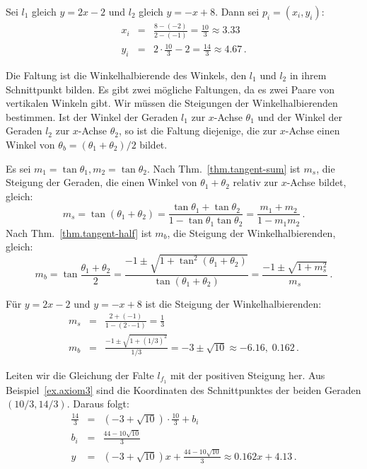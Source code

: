 \begin{example}\label{ex.axiom3}
Sei $l_1$ gleich $y=2x-2$ und $l_2$ gleich $y=-x+8$. Dann sei $p_i=(x_i,y_i)$:
\begin{eqnarray*}
x_i&=&\frac{8-(-2)}{2-(-1)}=\frac{10}{3}\approx 3.33\\
y_i &=& 2\cdot\frac{10}{3}-2=\frac{14}{3}\approx 4.67\,.
\end{eqnarray*}
\end{example}

Die Faltung ist die Winkelhalbierende des Winkels, den $l_1$ und $l_2$ in ihrem Schnittpunkt bilden. Es gibt zwei mögliche Faltungen, da es zwei Paare von vertikalen Winkeln gibt. Wir müssen die Steigungen der Winkelhalbierenden bestimmen. Ist der Winkel der Geraden $l_1$ zur $x$-Achse $\theta_1$ und der Winkel der Geraden $l_2$ zur $x$-Achse $\theta_2$, so ist die Faltung diejenige, die zur $x$-Achse einen Winkel von $\theta_b=(\theta_1+\theta_2)/2$ bildet.

Es sei $m_1=\tan\theta_1, m_2=\tan \theta_2$. Nach Thm.~\ref{thm.tangent-sum} ist $m_s$, die Steigung der Geraden, die einen Winkel von $\theta_1+\theta_2$ relativ zur $x$-Achse bildet, gleich:
\[
m_s=\tan(\theta_1+\theta_2)= \frac{\tan\theta_1+\tan\theta_2}{1-\tan\theta_1\tan\theta_2}=\frac{m_1+m_2}{1-m_1m_2}\,.
\]
Nach Thm.~\ref{thm.tangent-half} ist $m_b$, die Steigung der Winkelhalbierenden, gleich:
\[
m_b= \tan\frac{\theta_1+\theta_2}{2}=\frac{-1\pm\sqrt{1+\tan^2(\theta_1+\theta_2)}}{\tan (\theta_1+\theta_2)}=\frac{-1\pm\sqrt{1+m_s^2}}{m_s}\,.
\]
\begin{example}
Für $y=2x-2$ und $y=-x+8$ ist die Steigung der Winkelhalbierenden:
\begin{eqnarray*}
m_s&=&\frac{2+(-1)}{1-(2 \cdot -1)}=\frac{1}{3}\\
m_b&=&\frac{-1\pm\sqrt{1+(1/3)^2}}{1/3}=-3\pm \sqrt{10}\approx -6.16,\; 0.162\,.
\end{eqnarray*}
\end{example}

Leiten wir die Gleichung der Falte $l_{f_1}$ mit der positiven Steigung her. Aus Beispiel~\ref{ex.axiom3} sind die Koordinaten des Schnittpunktes der beiden Geraden $(10/3, 14/3)$. Daraus folgt:
\begin{eqnarray*}
\frac{14}{3} &=& (-3+\sqrt{10}) \cdot \frac{10}{3} + b_i\\ b_i&=&\frac{44-10\sqrt{10}}{3}\\
y&=& (-3+\sqrt{10})x + \frac{44-10\sqrt{10}}{3}\approx 0.162x+4.13\,.
\end{eqnarray*}

